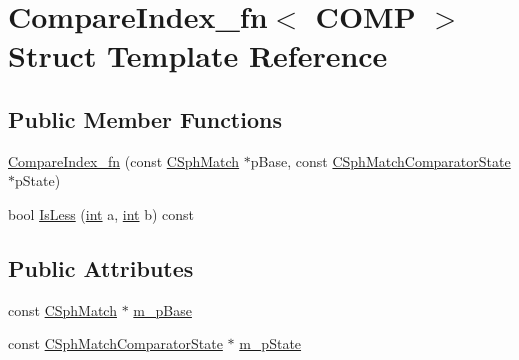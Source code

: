\hypertarget{structCompareIndex__fn}{\section{Compare\-Index\-\_\-fn$<$ C\-O\-M\-P $>$ Struct Template Reference}
\label{structCompareIndex__fn}
}
\subsection*{Public Member Functions}
\begin{DoxyCompactItemize}
\item 
\hyperlink{structCompareIndex__fn_ae5b85985a519336ca7f12d8b228d6e8f}{Compare\-Index\-\_\-fn} (const \hyperlink{classCSphMatch}{C\-Sph\-Match} $\ast$p\-Base, const \hyperlink{structCSphMatchComparatorState}{C\-Sph\-Match\-Comparator\-State} $\ast$p\-State)
\item 
bool \hyperlink{structCompareIndex__fn_a56b35a5ff9ad4e4f199252c1f78a7889}{Is\-Less} (\hyperlink{sphinxexpr_8cpp_a4a26e8f9cb8b736e0c4cbf4d16de985e}{int} a, \hyperlink{sphinxexpr_8cpp_a4a26e8f9cb8b736e0c4cbf4d16de985e}{int} b) const 
\end{DoxyCompactItemize}
\subsection*{Public Attributes}
\begin{DoxyCompactItemize}
\item 
const \hyperlink{classCSphMatch}{C\-Sph\-Match} $\ast$ \hyperlink{structCompareIndex__fn_ac1ea399af8852b8bb036803a2cdeb092}{m\-\_\-p\-Base}
\item 
const \hyperlink{structCSphMatchComparatorState}{C\-Sph\-Match\-Comparator\-State} $\ast$ \hyperlink{structCompareIndex__fn_ae27e275ab3d168e613ded5ae1bfb55b6}{m\-\_\-p\-State}
\end{DoxyCompactItemize}


